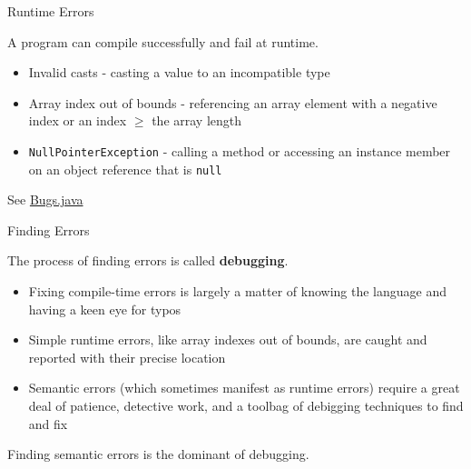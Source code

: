 \documentclass{beamer}
\newcommand{\code}{http://www.cc.gatech.edu/~simpkins/teaching/gatech/cs1331/code}
\begin{document}
\begin{frame}[fragile]{Runtime Errors}


A program can compile successfully and fail at runtime.
\begin{itemize}
\item Invalid casts - casting a value to an incompatible type
\item Array index out of bounds - referencing an array element with a negative index or an index $\ge$ the array length
\item {\tt NullPointerException} - calling a method or accessing an instance member on an object reference that is {\tt null}
\end{itemize}

\vspace{.2in}
See \href{\code/Bugs.java}{Bugs.java}

\end{frame}

\begin{frame}[fragile]{Finding Errors}


The process of finding errors is called {\bf debugging}.

\begin{itemize}
\item Fixing compile-time errors is largely a matter of knowing the language and having a keen eye for typos
\item Simple runtime errors, like array indexes out of bounds, are caught and reported with their precise location
\item Semantic errors (which sometimes manifest as runtime errors) require a great deal of patience, detective work, and a toolbag of debigging techniques to find and fix
\end{itemize}

Finding semantic errors is the dominant of debugging.

\end{frame}
\end{document}
